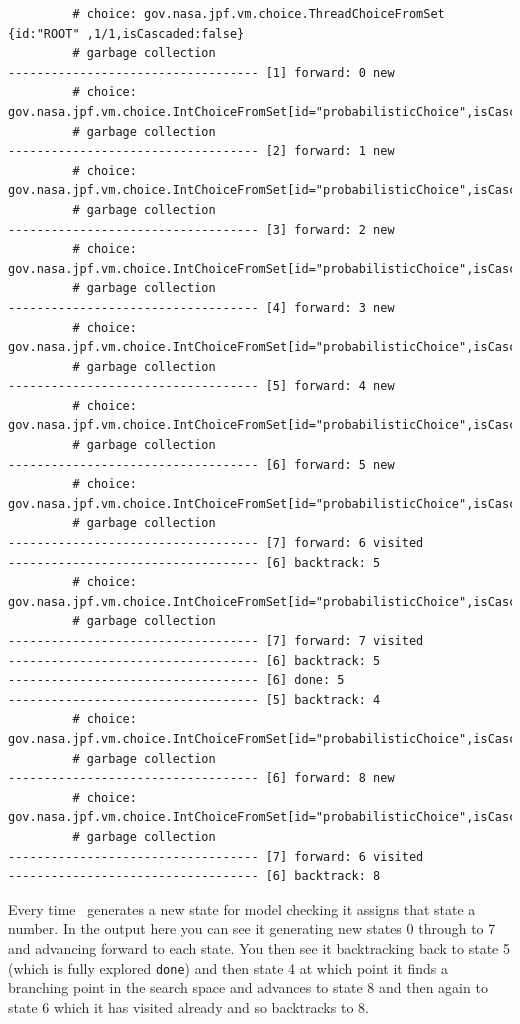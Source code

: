 \begin{small}
\begin{verbatim}
		 # choice: gov.nasa.jpf.vm.choice.ThreadChoiceFromSet {id:"ROOT" ,1/1,isCascaded:false}
		 # garbage collection
----------------------------------- [1] forward: 0 new
		 # choice: gov.nasa.jpf.vm.choice.IntChoiceFromSet[id="probabilisticChoice",isCascaded:false,>0,1]
		 # garbage collection
----------------------------------- [2] forward: 1 new
		 # choice: gov.nasa.jpf.vm.choice.IntChoiceFromSet[id="probabilisticChoice",isCascaded:false,>0,1]
		 # garbage collection
----------------------------------- [3] forward: 2 new
		 # choice: gov.nasa.jpf.vm.choice.IntChoiceFromSet[id="probabilisticChoice",isCascaded:false,>0,1]
		 # garbage collection
----------------------------------- [4] forward: 3 new
		 # choice: gov.nasa.jpf.vm.choice.IntChoiceFromSet[id="probabilisticChoice",isCascaded:false,>0,1]
		 # garbage collection
----------------------------------- [5] forward: 4 new
		 # choice: gov.nasa.jpf.vm.choice.IntChoiceFromSet[id="probabilisticChoice",isCascaded:false,>0,1]
		 # garbage collection
----------------------------------- [6] forward: 5 new
		 # choice: gov.nasa.jpf.vm.choice.IntChoiceFromSet[id="probabilisticChoice",isCascaded:false,>0,1]
		 # garbage collection
----------------------------------- [7] forward: 6 visited
----------------------------------- [6] backtrack: 5
		 # choice: gov.nasa.jpf.vm.choice.IntChoiceFromSet[id="probabilisticChoice",isCascaded:false,0,>1]
		 # garbage collection
----------------------------------- [7] forward: 7 visited
----------------------------------- [6] backtrack: 5
----------------------------------- [6] done: 5
----------------------------------- [5] backtrack: 4
		 # choice: gov.nasa.jpf.vm.choice.IntChoiceFromSet[id="probabilisticChoice",isCascaded:false,0,>1]
		 # garbage collection
----------------------------------- [6] forward: 8 new
		 # choice: gov.nasa.jpf.vm.choice.IntChoiceFromSet[id="probabilisticChoice",isCascaded:false,>0,1]
		 # garbage collection
----------------------------------- [7] forward: 6 visited
----------------------------------- [6] backtrack: 8
\end{verbatim}
\end{small}

Every time \jpf\ generates a new state for model checking it assigns that state a number.  In the output here you can see it generating new states 0 through to 7 and advancing forward to each state.  You then see it backtracking back to state 5 (which is fully explored \texttt{done}) and then state 4 at which point it finds a branching point in the search space and advances to state 8 and then again to state 6 which it has visited already and so backtracks to 8.

